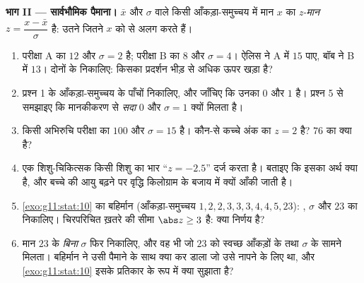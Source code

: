 \begin{problem}
\medskip
\noindent\textbf{भाग II --- सार्वभौमिक पैमाना।}
 $\bar x$ और  $\sigma$ वाले किसी आँकड़ा-समुच्चय में मान $x$ का
\emph{z-मान} $z = \dfrac{x - \bar x}{\sigma}$ है: उतने  जितने $x$ को  से
अलग करते हैं।
\begin{enumerate}[resume]
  \item परीक्षा A का  $12$ और $\sigma = 2$ है; परीक्षा B का  $8$ और
        $\sigma = 4$। ऐलिस ने A में $15$ पाए, बॉब ने B में $13$। दोनों के 
        निकालिए: किसका प्रदर्शन भीड़ से अधिक ऊपर खड़ा है?
  \item प्रश्न 1 के आँकड़ा-समुच्चय के पाँचों  निकालिए, और जाँचिए कि
        उनका  $0$ और  $1$ है। प्रश्न 5 से समझाइए कि
        मानकीकरण से \emph{सदा}  $0$ और $\sigma = 1$ क्यों मिलता है।
  \item किसी अभिरुचि परीक्षा का  $100$ और $\sigma = 15$ है। कौन-से कच्चे अंक
        का $z = 2$ है? $76$ का  क्या है?
  \item एक शिशु-चिकित्सक किसी शिशु का भार ``$z = -2.5$'' दर्ज करता है। बताइए कि
        इसका अर्थ क्या है, और बच्चे की आयु बढ़ने पर वृद्धि किलोग्राम के बजाय
         में क्यों आँकी जाती है।
  \item \cref{exo:g11:stat:10} का बहिर्मान (आँकड़ा-समुच्चय $1, 2, 2, 3, 3, 3, 4, 4, 5, 23$): , $\sigma$ और $23$ का
         निकालिए। चिरपरिचित ख़तरे की सीमा $\abs z \geq 3$ है: क्या निर्णय है?
  \item मान $23$ के \emph{बिना} $\sigma$ फिर निकालिए, और वह  भी जो $23$
        को स्वच्छ आँकड़ों के  तथा $\sigma$ के सामने मिलता। बहिर्मान ने उसी
        पैमाने के साथ क्या कर डाला जो उसे नापने के लिए था, और \cref{exo:g11:stat:10} इसके
        प्रतिकार के रूप में क्या सुझाता है?
\end{enumerate}


\end{problem}
